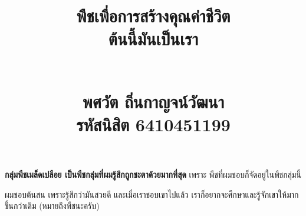\documentclass{article}
\title{\flushleft\Large พืชเพื่อการสร้างคุณค่าชีวิต\\
\Huge\textbf{ต้นนี้มันเป็นเรา}\\
\rule{0em}{1ex}\\
\normalsize พศวัต ถิ่นกาญจน์วัฒนา\\
รหัสนิสิต 6410451199
\vspace{-8ex}}
\author{}
\date{}
\begin{document}
\maketitle
\sloppy\flushleft
\textbf{กลุ่มพืชเมล็ดเปลือย เป็นพืชกลุ่มที่ผมรู้สึกถูกชะตาด้วยมากที่สุด} เพราะ พืชที่ผมชอบก็จัดอยู่ในพืชกลุ่มนี้

\rule{0em}{1ex}

ผมชอบต้นสน เพราะรู้สึกว่ามันสวยดี และเมื่อเราชอบเขาไปแล้ว เราก็อยากจะศึกษาและรู้จักเขาให้มากขึ้นกว่าเดิม (หมายถึงพืชนะครับ)
\end{document}
